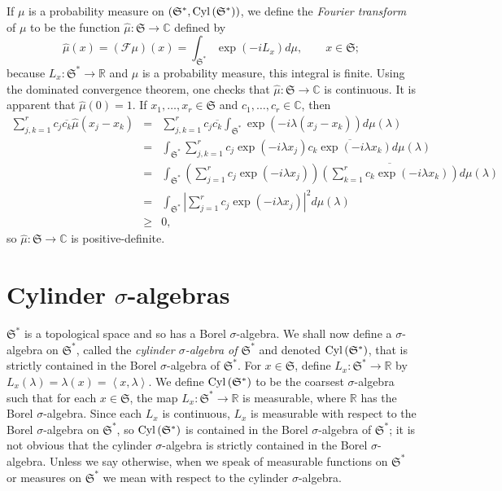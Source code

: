 \documentclass{article}
\newcommand{\inner}[2]{\left\langle #1, #2 \right\rangle}
\newcommand{\Cyl}{\ensuremath\mathrm{Cyl}\,}
\theoremstyle{definition}
\begin{document}
If $\mu$ is a probability measure on $(\mathfrak{S}^*,\Cyl(\mathfrak{S}^*))$, we define the {\em Fourier transform} of $\mu$ to be the function $\hat{\mu}:\mathfrak{S} \to \mathbb{C}$
defined by
\[
\hat{\mu}(x) =(\mathscr{F} \mu)(x)= \int_{\mathfrak{S}^*} \exp(-iL_x) d\mu, \qquad x \in \mathfrak{S};
\]
because $L_x:\mathfrak{S}^* \to \mathbb{R}$ and $\mu$ is a probability measure, this integral is finite. 
 Using the dominated convergence theorem, one checks that
  $\hat{\mu}:\mathfrak{S} \to \mathbb{C}$ is continuous. It is apparent that $\hat{\mu}(0)=1$. 
If $x_1,\ldots,x_r \in \mathfrak{S}$ and $c_1,\ldots,c_r \in \mathbb{C}$, then
\begin{eqnarray*}
\sum_{j,k=1}^r c_j\overline{c_k} \hat{\mu}(x_j-x_k)&=&\sum_{j,k=1}^r c_j \overline{c_k} \int_{\mathfrak{S}^*} \exp(-i\lambda(x_j-x_k)) d\mu(\lambda)\\
&=&\int_{\mathfrak{S}^*} \sum_{j,k=1}^r c_j \exp(-i\lambda x_j) \overline{c_k \exp(-i\lambda x_k)} d\mu(\lambda)\\
&=&\int_{\mathfrak{S}^*} \left( \sum_{j=1}^r c_j \exp(-i\lambda x_j) \right) \overline{\left(\sum_{k=1}^r c_k \exp(-i\lambda x_k) \right)} d\mu(\lambda)\\
&=&\int_{\mathfrak{S}^*} \left| \sum_{j=1}^r c_j \exp(-i\lambda x_j)\right|^2 d\mu(\lambda)\\
&\geq&0,
\end{eqnarray*}
so $\hat{\mu}:\mathfrak{S} \to \mathbb{C}$ is positive-definite. 



\section{Cylinder $\sigma$-algebras}
$\mathfrak{S}^*$ is a topological space and so has a Borel $\sigma$-algebra.
We shall now define a $\sigma$-algebra on $\mathfrak{S}^*$, called the {\em cylinder $\sigma$-algebra of $\mathfrak{S}^*$} and denoted
$\Cyl(\mathfrak{S}^*)$, that is strictly contained in the Borel $\sigma$-algebra of $\mathfrak{S}^*$. 
For $x \in \mathfrak{S}$, define $L_x:\mathfrak{S}^* \to \mathbb{R}$ by $L_x(\lambda)=\lambda(x)=\inner{x}{\lambda}$. 
We define $\Cyl(\mathfrak{S}^*)$ to be the coarsest $\sigma$-algebra such that for each $x \in \mathfrak{S}$, the map $L_x:\mathfrak{S}^* \to \mathbb{R}$
is measurable, where $\mathbb{R}$ has the Borel $\sigma$-algebra. Since each $L_x$ is continuous, $L_x$  is measurable with respect to the Borel
$\sigma$-algebra on $\mathfrak{S}^*$, so
$\Cyl(\mathfrak{S}^*)$ is contained in the Borel $\sigma$-algebra of $\mathfrak{S}^*$; it is not obvious 
that the cylinder $\sigma$-algebra is strictly contained in the Borel $\sigma$-algebra.
Unless we say otherwise, when we speak of measurable functions on $\mathfrak{S}^*$ or measures on $\mathfrak{S}^*$ we mean with
respect to the cylinder $\sigma$-algebra.
\end{document}
